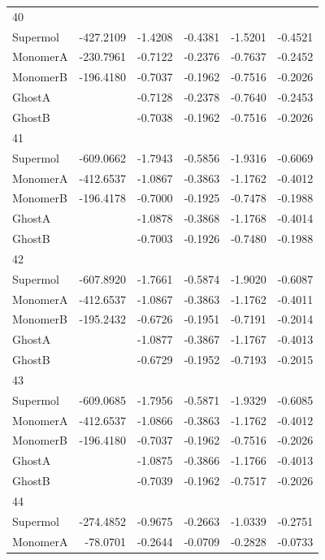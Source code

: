 \documentclass[journal=jctcce,manuscript=article]{achemso}
\begin{document}
\begin{spacing}{1}
\begin{longtable}{lRRRRR}
    40 &  &  &  &  &  \\
    Supermol & -427.2109 & -1.4208 & -0.4381 & -1.5201 & -0.4521 \\
    MonomerA & -230.7961 & -0.7122 & -0.2376 & -0.7637 & -0.2452 \\
    MonomerB & -196.4180 & -0.7037 & -0.1962 & -0.7516 & -0.2026 \\
    GhostA &  & -0.7128 & -0.2378 & -0.7640 & -0.2453 \\
    GhostB &  & -0.7038 & -0.1962 & -0.7516 & -0.2026 \\
    41 &  &  &  &  &  \\
    Supermol & -609.0662 & -1.7943 & -0.5856 & -1.9316 & -0.6069 \\
    MonomerA & -412.6537 & -1.0867 & -0.3863 & -1.1762 & -0.4012 \\
    MonomerB & -196.4178 & -0.7000 & -0.1925 & -0.7478 & -0.1988 \\
    GhostA &  & -1.0878 & -0.3868 & -1.1768 & -0.4014 \\
    GhostB &  & -0.7003 & -0.1926 & -0.7480 & -0.1988 \\
    42 &  &  &  &  &  \\
    Supermol & -607.8920 & -1.7661 & -0.5874 & -1.9020 & -0.6087 \\
    MonomerA & -412.6537 & -1.0867 & -0.3863 & -1.1762 & -0.4011 \\
    MonomerB & -195.2432 & -0.6726 & -0.1951 & -0.7191 & -0.2014 \\
    GhostA &  & -1.0877 & -0.3867 & -1.1767 & -0.4013 \\
    GhostB &  & -0.6729 & -0.1952 & -0.7193 & -0.2015 \\
    43 &  &  &  &  &  \\
    Supermol & -609.0685 & -1.7956 & -0.5871 & -1.9329 & -0.6085 \\
    MonomerA & -412.6537 & -1.0866 & -0.3863 & -1.1762 & -0.4012 \\
    MonomerB & -196.4180 & -0.7037 & -0.1962 & -0.7516 & -0.2026 \\
    GhostA &  & -1.0875 & -0.3866 & -1.1766 & -0.4013 \\
    GhostB &  & -0.7039 & -0.1962 & -0.7517 & -0.2026 \\
    44 &  &  &  &  &  \\
    Supermol & -274.4852 & -0.9675 & -0.2663 & -1.0339 & -0.2751 \\
    MonomerA & -78.0701 & -0.2644 & -0.0709 & -0.2828 & -0.0733 \\

\end{longtable}
\end{spacing}
\end{document}
